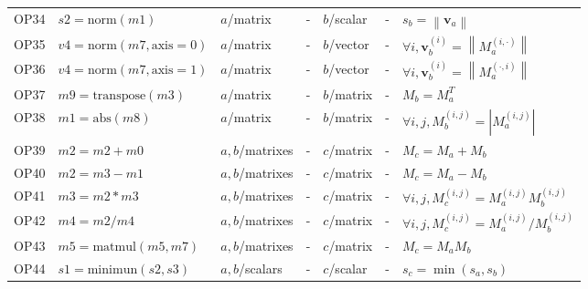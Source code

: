 \documentclass[11pt,oneside,openany,report]{jsbook}
\begin{document}
\begin{center}
{{\begin{longtable}{l|l|lc|lc|l}
        OP34 & $s2 = \mathrm{norm}(m1)$                   & $a$/matrix              & -               & $b$/scalar & -     & $s_b = \left\| \bm{v}_a \right\|$                                              \\
        OP35 & $v4 = \mathrm{norm}(m7, \mathrm{axis}=0)$  & $a$/matrix              & -               & $b$/vector & -     & $\forall i, \bm{v}_b^{(i)} = \left\| M_a^{(i, \cdot)} \right\|$                \\
        OP36 & $v4 = \mathrm{norm}(m7, \mathrm{axis}=1)$  & $a$/matrix              & -               & $b$/vector & -     & $\forall i, \bm{v}_b^{(i)} = \left\| M_a^{(\cdot, i)} \right\|$                \\
        OP37 & $m9 = \mathrm{transpose}(m3)$              & $a$/matrix              & -               & $b$/matrix & -     & $M_b = M_a^T$                                                                  \\
        OP38 & $m1 = \mathrm{abs}(m8)$                    & $a$/matrix              & -               & $b$/matrix & -     & $ \forall i,j, M_b^{(i,j)} = \left|M_a^{(i, j)}\right| $                       \\
        OP39 & $m2 = m2 + m0$                             & $a,b$/matrixes          & -               & $c$/matrix & -     & $M_c = M_a + M_b$                                                              \\
        OP40 & $m2 = m3 - m1$                             & $a,b$/matrixes          & -               & $c$/matrix & -     & $M_c = M_a - M_b$                                                              \\
        OP41 & $m3 = m2 * m3$                             & $a,b$/matrixes          & -               & $c$/matrix & -     & $\forall i,j, M_c^{(i,j)} = M_a^{(i,j)} M_b^{(i,j)}$                           \\
        OP42 & $m4 = m2 / m4$                             & $a,b$/matrixes          & -               & $c$/matrix & -     & $\forall i,j, M_c^{(i,j)} = M_a^{(i,j)} / M_b^{(i,j)}$                         \\
        OP43 & $m5 = \mathrm{matmul}(m5, m7)$             & $a,b$/matrixes          & -               & $c$/matrix & -     & $M_c = M_a M_b$                                                                \\
        OP44 & $s1 = \mathrm{minimun}(s2, s3)$            & $a,b$/scalars           & -               & $c$/scalar & -     & $s_c = \min{(s_a,s_b)}$                                                        \\

\end{longtable}}}
\end{center}
\end{document}
